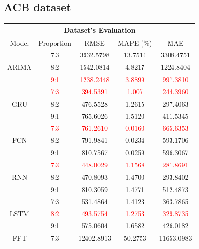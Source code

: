 \documentclass{ieeeojies}
\begin{document}
\subsection{ACB dataset} 
\begin{table}[H]
    \centering
    \begin{tabular}{|c|c|c|c|c|}
         \hline
         \multicolumn{5}{|c|}{\textbf{Dataset's Evaluation}}\\
         \hline
         \centering Model & Proportion & RMSE & MAPE (\%) & MAE\\
         \hline
         \multirow{3}{*}{ARIMA} 
         & 7:3  & 3932.5798 & 13.7514 & 3308.4751 \\ 
         & 8:2 & 1542.0814 & 4.8217 & 1224.8404 \\ 
         & \textcolor{red}{9:1} & \textcolor{red}{1238.2448} & \textcolor{red}{3.8899} & \textcolor{red}{997.3810} \\
         \hline
         \multirow{3}{*}{GRU} 
         & \textcolor{red}{7:3}  & \textcolor{red}{394.5391} & \textcolor{red}{1.007} & \textcolor{red}{244.3960} \\ 
         & 8:2 & 476.5528 & 1.2615 & 297.4063 \\ 
         & 9:1 & 765.6026 & 1.5120 & 411.5345 \\
         \hline
         \multirow{3}{*}{FCN} 
         & \textcolor{red}{7:3}  & \textcolor{red}{761.2610} & \textcolor{red}{0.0160} & \textcolor{red}{665.6353} \\ 
         & 8:2 & 791.9841 & 0.0234 & 593.1706 \\ 
         & 9:1 & 810.7567 & 0.0259 & 596.3067 \\
         \hline
         \multirow{3}{*}{RNN} 
         & \textcolor{red}{7:3}  & \textcolor{red}{448.0029} & \textcolor{red}{1.1568} & \textcolor{red}{281.8691} \\ 
         & 8:2 & 470.8093 & 1.4700 & 293.8402 \\ 
         & 9:1 & 810.3059 & 1.4771 & 512.4873 \\
         \hline
         \multirow{3}{*}{LSTM} 
         & 7:3 & 531.4864 & 1.4123 & 363.7865 \\ 
         & \textcolor{red}{8:2}  & \textcolor{red}{493.5754} & \textcolor{red}{1.2753} & \textcolor{red}{329.8735} \\ 
         & 9:1 & 575.0604 & 1.6582 & 426.0182 \\
         \hline
         \multirow{3}{*}{FFT} 
         & 7:3 & 12402.8913 & 50.2753 & 11653.0983 \\ 

\end{tabular}
\end{table}
\end{document}

